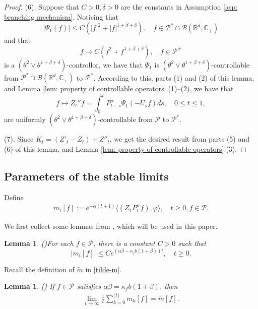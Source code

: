 \documentclass[12pt,a4paper]{amsart}
\theoremstyle{plain}
\newtheorem{lem}[thm]{Lemma}
\theoremstyle{definition}
\numberwithin{equation}{section}
\begin{document}
\begin{proof}
    (6). Suppose that $C>0, \delta>0$ are the constants in Assumption \ref{asp: branching mechanism}.
    Noticing that
\[
    |\Psi_1(f)|
    \le C(|f|^2+|f|^{1+\beta+ \delta}),
    \quad f\in \mathcal P^*\cap\mathcal B(\mathbb R^d, \mathbb C_+)
\]
    and that
\[
    f\mapsto C(f^2+f^{1+\beta+\delta}),
    \quad f\in \mathcal P^+
\]
    is a $(\theta^2 \vee \theta^{1+\beta+\delta})$-controllor, we have that $\Psi_1$ is $(\theta^2 \vee \theta^{1+\beta+\delta})$-controllable from $\mathcal P^*\cap\mathcal B(\mathbb R^d, \mathbb C_+)$ to $\mathcal P^*$.
    According to this, parts (1) and (2) of this lemma, and Lemma \ref{lem: property of controllable operators}.(1)--(2), we have that
\[
    f
    \mapsto Z_t'' f
    = \int_0^t P_{t-s}^\alpha \Psi_1(-U_sf)ds,
    \quad 0\leq t\leq 1,
\]
    are uniformly $(\theta^2 \vee \theta^{1+\beta+\delta})$-controllable from $\mathcal P$ to $\mathcal P^*$.

(7). Since $K_t = (Z'_t-Z_t)+Z''_t$, we get the desired result from parts (5) and  (6) of this lemma,  and Lemma \ref{lem: property of controllable operators}.(3).
\end{proof}

\subsection{Parameters of the stable limits}
   Define
 \begin{equation}\begin{split}
 \label{parameter_mk}
      m_t[f]
      :=e^{-\alpha (t+1)} \langle (Z_1P^\alpha_t f), \varphi\rangle,\quad t\geq 0, f\in \mathcal P.
 \end{split}\end{equation}

 We first collect some lemmas from \cite{MM}, which will be used in this paper.
 \begin{lem}(\cite[Lemma 2.7]{MM})\label{Lemma2.7} For each $f\in\mathcal{P}$, there is a constant $C>0$ such that
\begin{equation}\label{domi-m}
    |m_t[f]|
    \leq C e^{(\alpha\beta-\kappa_fb(1+\beta))t},
    \quad t\geq 0.
\end{equation}
\end{lem}
 Recall the definition of $\widetilde{m}$ in \eqref{tilde-m}.
  \begin{lem}(\cite[Lemma 4.2]{MM})
    If $f \in \mathcal{P}$ satisfies $\alpha\beta=\kappa_f b(1+\beta)$,
    then
\begin{equation}\begin{split}
\label{para: critical case}
\lim_{t\rightarrow \infty}\frac{1}{t}\sum_{k=0}^{\lfloor t \rfloor}m_k[f]=
 \widetilde{m}[f].
\end{split}\end{equation}
\end{lem}
\end{document}
